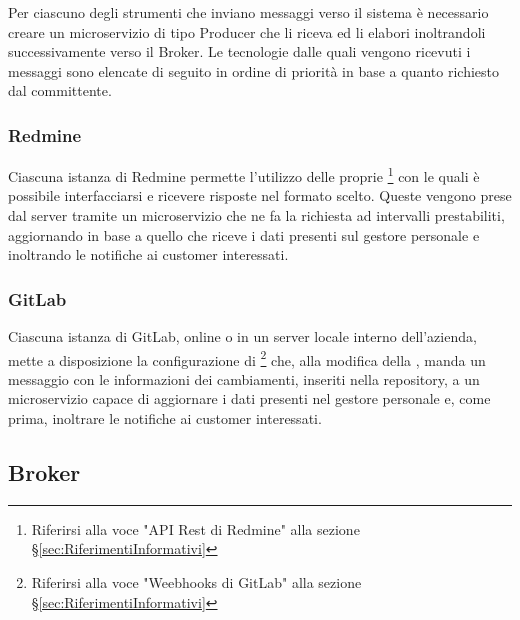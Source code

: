 		Per ciascuno degli strumenti che inviano messaggi verso il sistema è necessario creare un microservizio di tipo Producer che li riceva ed li elabori inoltrandoli successivamente verso il Broker.
		Le tecnologie dalle quali vengono ricevuti i messaggi sono elencate di seguito in ordine di priorità in base a quanto richiesto dal committente.

		\subsubsection{Redmine}
		Ciascuna istanza di Redmine permette l'utilizzo delle proprie \footnote{Riferirsi alla voce "API Rest di Redmine" alla sezione \S\ref{sec:RiferimentiInformativi}} con le quali è possibile interfacciarsi e ricevere risposte nel formato scelto.
		Queste vengono prese dal server tramite un microservizio che ne fa la richiesta ad intervalli prestabiliti, aggiornando in base a quello che riceve i dati presenti sul gestore personale e inoltrando le notifiche ai customer interessati.
		
		\subsubsection{GitLab}
		Ciascuna istanza di GitLab, online o in un server locale interno dell'azienda, mette a disposizione la configurazione di \footnote{Riferirsi alla voce "Weebhooks di GitLab" alla sezione \S\ref{sec:RiferimentiInformativi}} che, alla modifica della , manda un messaggio con le informazioni dei cambiamenti, inseriti nella repository, a un microservizio capace di aggiornare i dati presenti nel gestore personale e, come prima, inoltrare le notifiche ai customer interessati.
		
		
	\subsection{Broker}
	
